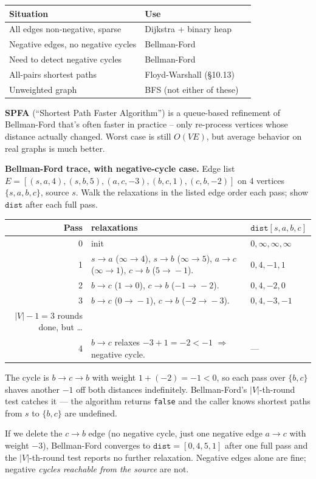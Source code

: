 \documentclass[11pt]{article}
\begin{document}
\begin{center}
\begin{tabular}{lll}
\hline
Situation & Use \\
\hline
All edges non-negative, sparse & Dijkstra + binary heap \\
Negative edges, no negative cycles & Bellman-Ford \\
Need to detect negative cycles & Bellman-Ford \\
All-pairs shortest paths & Floyd-Warshall (§10.13) \\
Unweighted graph & BFS (not either of these) \\
\hline
\end{tabular}
\end{center}

\begin{notebox}
\textbf{SPFA} (``Shortest Path Faster Algorithm'') is a queue-based refinement of Bellman-Ford that's often faster in practice -- only re-process vertices whose distance actually changed. Worst case is still $O(VE)$, but average behavior on real graphs is much better.
\end{notebox}

\begin{examplebox}
\textbf{Bellman-Ford trace, with negative-cycle case.} Edge list
$E = [(s, a, 4), (s, b, 5), (a, c, -3), (b, c, 1), (c, b, -2)]$
on 4 vertices $\{s, a, b, c\}$, source $s$. Walk the relaxations
in the listed edge order each pass; show $\texttt{dist}$ after
each full pass.

\medskip
\begin{tabular}{rp{8.5cm}|l}
\hline
Pass & relaxations & $\texttt{dist}[s, a, b, c]$ \\
\hline
0 & init & $0, \infty, \infty, \infty$ \\
1 & $s{\to}a$ ($\infty\!\to\!4$), $s{\to}b$ ($\infty\!\to\!5$),
    $a{\to}c$ ($\infty\!\to\!1$), $c{\to}b$ ($5\!\to\!-1$). & $0, 4, -1, 1$ \\
2 & $b{\to}c$ ($1\!\to\!0$), $c{\to}b$ ($-1\!\to\!-2$). & $0, 4, -2, 0$ \\
3 & $b{\to}c$ ($0\!\to\!-1$), $c{\to}b$ ($-2\!\to\!-3$). & $0, 4, -3, -1$ \\
\hline
$|V|{-}1 = 3$ rounds done, but \dots & & \\
\hline
4 & $b{\to}c$ relaxes $-3 + 1 = -2 < -1$ $\Rightarrow$ negative cycle. & --- \\
\hline
\end{tabular}

\medskip
The cycle is $b \to c \to b$ with weight $1 + (-2) = -1 < 0$, so
each pass over $\{b, c\}$ shaves another $-1$ off both distances
indefinitely. Bellman-Ford's $|V|$-th-round test catches it ---
the algorithm returns \texttt{false} and the caller knows
shortest paths from $s$ to $\{b, c\}$ are undefined.

\smallskip
If we delete the $c \to b$ edge (no negative cycle, just one
negative edge $a \to c$ with weight $-3$), Bellman-Ford
converges to $\texttt{dist} = [0, 4, 5, 1]$ after one full pass
and the $|V|$-th-round test reports no further relaxation.
Negative edges alone are fine; negative \emph{cycles reachable
from the source} are not.
\end{examplebox}
\end{document}
